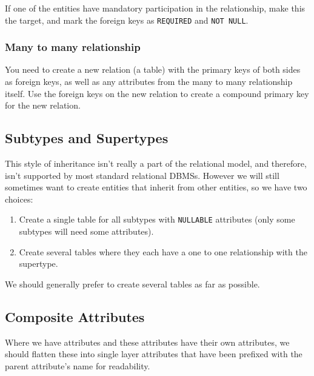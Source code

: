 \begin{note}
    If one of the entities have mandatory participation in the relationship, make this the target, and mark the foreign keys as \texttt{REQUIRED} and \texttt{NOT NULL}.
\end{note}

\subsubsection{Many to many relationship}\label{ssub:many_to_many_relationship}

You need to create a new relation (a table) with the primary keys of both sides as foreign keys, as well as any attributes from the many to many relationship itself.
Use the foreign keys on the new relation to create a compound primary key for the new relation.

\subsection{Subtypes and Supertypes}\label{sub:subtypes_and_supertypes}

This style of inheritance isn't really a part of the relational model, and therefore, isn't supported by most standard relational DBMSs.
However we will still sometimes want to create entities that inherit from other entities, so we have two choices:
\begin{enumerate}
    \item Create a single table for all subtypes with \texttt{NULLABLE} attributes (only some subtypes will need some attributes).
    \item Create several tables where they each have a one to one relationship with the supertype.
\end{enumerate}

\begin{note}
    We should generally prefer to create several tables as far as possible.
\end{note}

\subsection{Composite Attributes}\label{sub:composite_attributes}

Where we have attributes and these attributes have their own attributes, we should flatten these into single layer attributes that have been prefixed with the parent attribute's name for readability.

